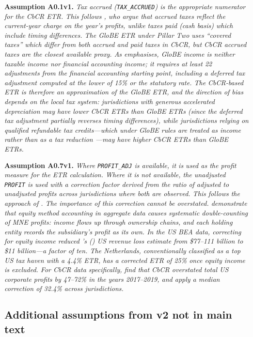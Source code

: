 \documentclass[11pt,a4paper]{article}
\newcommand{\code}[1]{\texttt{#1}}
\newcommand{\assumption}[2]{\noindent\textbf{Assumption #1.} \textit{#2}\medskip}
\begin{document}
\assumption{A0.1v1}{Tax accrued (\code{TAX\_ACCRUED}) is the appropriate numerator for the CbCR ETR. This follows \citet{hugger2026}, who argue that accrued taxes reflect the current-year charge on the year's profits, unlike taxes paid (cash basis) which include timing differences. The GloBE ETR under Pillar Two uses ``covered taxes'' which differ from both accrued and paid taxes in CbCR, but CbCR accrued taxes are the closest available proxy. As \citet{hanlon2023} emphasises, GloBE income is neither taxable income nor financial accounting income; it requires at least 22 adjustments from the financial accounting starting point, including a deferred tax adjustment computed at the lower of 15\% or the statutory rate. The CbCR-based ETR is therefore an approximation of the GloBE ETR, and the direction of bias depends on the local tax system: jurisdictions with generous accelerated depreciation may have lower CbCR ETRs than GloBE ETRs (since the deferred tax adjustment partially reverses timing differences), while jurisdictions relying on qualified refundable tax credits---which under GloBE rules are treated as income rather than as a tax reduction \citep{ferreiraliotti2022}---may have higher CbCR ETRs than GloBE ETRs.}

\assumption{A0.7v1}{Where \code{PROFIT\_ADJ} is available, it is used as the profit measure for the ETR calculation. Where it is not available, the unadjusted \code{PROFIT} is used with a correction factor derived from the ratio of adjusted to unadjusted profits across jurisdictions where both are observed. This follows the approach of \citet{hugger2026}. The importance of this correction cannot be overstated. \citet{blouin2023} demonstrate that equity method accounting in aggregate data causes systematic double-counting of MNE profits: income flows up through ownership chains, and each holding entity records the subsidiary's profit as its own. In the US BEA data, correcting for equity income reduced \citeauthor{clausing2016}'s (\citeyear{clausing2016}) US revenue loss estimate from \$77--111 billion to \$11 billion---a factor of ten. The Netherlands, conventionally classified as a top US tax haven with a 4.4\% ETR, has a corrected ETR of 25\% once equity income is excluded. For CbCR data specifically, \citet{garcia-bernardo2022} find that CbCR overstated total US corporate profits by 47--72\% in the years 2017--2019, and \citet{hugger2026} apply a median correction of 32.4\% across jurisdictions.}

\subsection{Additional assumptions from v2 not in main text}
\end{document}
